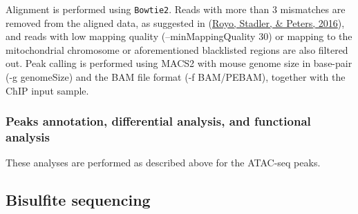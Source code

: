 \documentclass[12pt,twoside]{reedthesis}
\begin{document}
Alignment is performed using \texttt{Bowtie2}. Reads with more than 3
mismatches are removed from the aligned data, as suggested in
(\protect\hyperlink{ref-royo2016}{Royo, Stadler, \& Peters, 2016}), and reads with low mapping quality (--minMappingQuality 30)
or mapping to the mitochondrial chromosome or aforementioned blacklisted
regions are also filtered out. Peak calling is performed using MACS2
with mouse genome size in base-pair (-g genomeSize) and the BAM file
format (-f BAM/PEBAM), together with the ChIP input sample.

\hypertarget{m3.4.2}{%
\subsubsection*{Peaks annotation, differential analysis, and functional analysis}\label{m3.4.2}}

These analyses are performed as described above for the ATAC-seq peaks.

\hypertarget{m3.5}{%
\subsection*{Bisulfite sequencing}\label{m3.5}}
\end{document}
